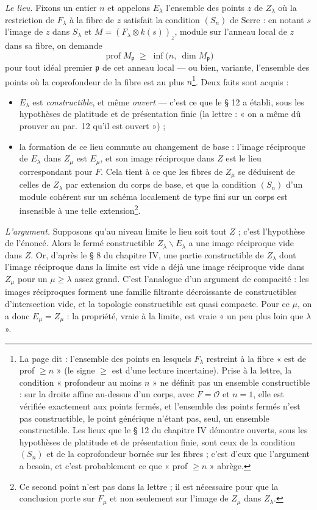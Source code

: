 \documentclass[11pt,a4paper]{article}
\begin{document}
\emph{Le lieu.} Fixons un entier $n$ et appelons $E_\lambda$ l'ensemble des
points $z$ de $Z_\lambda$ où la restriction de $F_\lambda$ à la fibre de $z$
satisfait la condition $(S_n)$ de Serre : en notant $s$ l'image de $z$
dans $S_\lambda$ et $M = (F_\lambda \otimes k(s))_z$, module sur l'anneau
local de $z$ dans sa fibre, on demande
\[ \operatorname{prof} M_{\mathfrak{p}} \;\geq\;
\inf\bigl(n,\ \dim M_{\mathfrak{p}}\bigr) \]
pour tout idéal premier $\mathfrak{p}$ de cet anneau local — ou bien, variante, l'ensemble des
points où la coprofondeur de la fibre est au plus $n$\footnote{La page dit :
l'ensemble des points en lesquels $F_\lambda$ restreint à la fibre « est de
prof $\geq n$ » (le signe $\geq$ est d'une lecture incertaine). Prise à la
lettre, la condition « profondeur au moins $n$ » ne définit pas un ensemble
constructible : sur la droite affine au-dessus d'un corps, avec
$F = \mathcal{O}$ et $n = 1$, elle est vérifiée exactement aux points fermés,
et l'ensemble des points fermés n'est pas constructible, le point générique
n'étant pas, seul, un ensemble constructible. Les lieux que le § 12 du
chapitre IV démontre ouverts, sous les hypothèses de platitude et de
présentation finie, sont ceux de la condition $(S_n)$ et de la coprofondeur
bornée sur les fibres ; c'est d'eux que l'argument a besoin, et c'est
probablement ce que « prof $\geq n$ » abrège.}. Deux faits sont acquis :
\begin{itemize}
  \item $E_\lambda$ est \emph{constructible}, et même \emph{ouvert} — c'est ce
  que le § 12 a établi, sous les hypothèses de platitude et de présentation
  finie (la lettre : « on a même dû prouver au par.~12 qu'il est ouvert ») ;
  \item la formation de ce lieu commute au changement de base : l'image
  réciproque de $E_\lambda$ dans $Z_\mu$ est $E_\mu$, et son image réciproque
  dans $Z$ est le lieu correspondant pour $F$. Cela tient à ce que les fibres
  de $Z_\mu$ se déduisent de celles de $Z_\lambda$ par extension du corps de
  base, et que la condition $(S_n)$ d'un module cohérent sur un schéma
  localement de type fini sur un corps est insensible à une telle
  extension\footnote{Ce second point n'est pas dans la lettre ; il est
  nécessaire pour que la conclusion porte sur $F_\mu$ et non seulement sur
  l'image de $Z_\mu$ dans $Z_\lambda$.}.
\end{itemize}

\emph{L'argument.} Supposons qu'au niveau limite le lieu soit tout $Z$ ;
c'est l'hypothèse de l'énoncé. Alors le fermé constructible
$Z_\lambda \smallsetminus E_\lambda$ a une image réciproque vide dans $Z$. Or,
d'après le § 8 du chapitre IV, une partie constructible de $Z_\lambda$ dont
l'image réciproque dans la limite est vide a déjà une image réciproque vide
dans $Z_\mu$ pour un $\mu \geq \lambda$ assez grand. C'est l'analogue d'un
argument de compacité : les images réciproques forment une famille filtrante
décroissante de constructibles d'intersection vide, et la topologie
constructible est quasi compacte. Pour ce $\mu$, on a donc $E_\mu = Z_\mu$ :
la propriété, vraie à la limite, est vraie « un peu plus loin que
$\lambda$ ».
\end{document}
